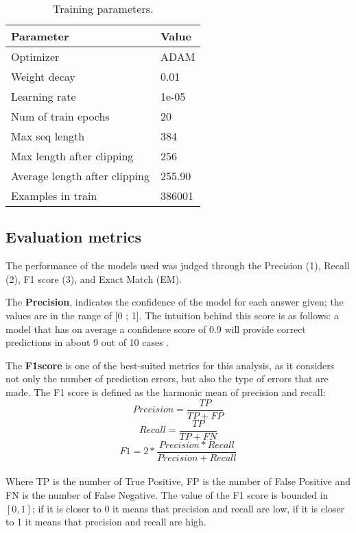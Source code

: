 \documentclass[runningheads]{llncs}
\begin{document}
\begin{table}
 \centering
\caption{Training parameters.}\label{tab1}
\begin{tabular}{|l|l|}
\hline
Parameter &  Value \\
\hline
        Optimizer   &  ADAM\\
        Weight decay    &  0.01  \\
        Learning rate   &  1e-05     \\
        Num of train epochs & 20 \\
        Max seq length  & 384 \\
        Max length  after clipping  & 256 \\
        Average length after clipping   &   255.90 \\
        Examples in train & 386001  \\ 
\hline
\end{tabular}
\end{table}

\subsection{Evaluation metrics}
The performance of the models used was judged through the Precision (1), Recall (2), F1 score (3), and Exact Match (EM).

The \textbf{Precision}, indicates the confidence of the model for each answer given; the values are in the range of [0 ; 1]. The intuition behind this score is as follows: a model that has on average a confidence score of 0.9 will provide correct predictions in about 9 out of 10 cases \cite{c7}.

The \textbf{F1score} is one of the best-suited metrics for this analysis, as it considers not only the number of prediction errors, but also the type of errors that are made. 
The F1 score is defined as the harmonic mean of precision and recall:
\begin{equation}
    \label{eq:eg2}
    Precision =  \frac{TP}{TP+FP} 
\end{equation}
\begin{equation}
    \label{eq:eg2}
     Recall =  \frac{TP}{TP+FN} 
\end{equation}
\begin{equation}
    \label{eq:eg2}
    F1 =  2*\frac{Precision*Recall}{Precision+Recall} 
\end{equation}
\\
Where TP is the number of True Positive, FP is the number of False Positive and FN is the number of False Negative.
The value of the F1 score is bounded in  $[0,1]$; if it is closer to 0 it means that precision and recall are low, if it is closer to 1 it means that precision and recall are high. 
\end{document}
